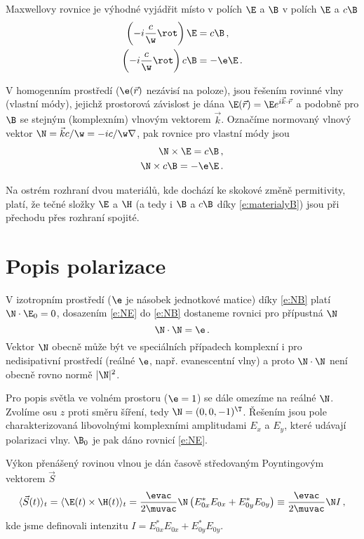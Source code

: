 Maxwellovy rovnice je výhodné vyjádřit místo v polích $\E$ a $\B$ v polích $\E$ a $c\B$
\begin{align}
\left(-i\frac{c}{\w}\rot\right) \E&=c\B \,, \label{e:rotE}\\
\left(-i\frac{c}{\w}\rot\right) c\B&=-\e \E \,. \label{e:rotB}
\end{align}

V homogenním prostředí ($\e(\vec{r})$ nezávisí na poloze), jsou řešením rovinné vlny (vlastní módy), jejichž prostorová závislost je dána $\E(\vec{r})=\E e^{i \vec{k}\cdot\vec{r}}$ a podobně pro $\B$ se stejným (komplexním) vlnovým vektorem $\vec{k}$.
Označíme normovaný vlnový vektor $\N=\vec{k} c/\w=-ic/\w\nabla$, pak rovnice pro vlastní módy jsou
\begin{align}
\N \times \E = c\B \,, \label{e:NE}\\
\N \times c\B = -\e \E \,. \label{e:NB}
\end{align}

Na ostrém rozhraní dvou materiálů, kde dochází ke skokové změně permitivity, platí, že tečné složky $\E$ a $\H$ (a tedy i $\B$ a $c\B$ díky \eqref{e:materialyB}) jsou při přechodu přes rozhraní spojité\cite{Bornwolf}.


\section{Popis polarizace}
V izotropním prostředí ($\e$ je násobek jednotkové matice) díky \eqref{e:NB} platí $\N \cdot \E_0=0$, dosazením \eqref{e:NE} do \eqref{e:NB} dostaneme rovnici pro přípustná $\N$
\begin{equation}
\N \cdot \N =\e \,.
\end{equation}
Vektor $\N$ obecně může být ve speciálních případech komplexní i pro nedisipativní prostředí (reálné $\e$, např. evanescentní vlny) a proto $\N \cdot \N$ není obecně rovno normě $|\N|^2$.

Pro popis světla ve volném prostoru ($\e=1$) se dále omezíme na reálné $\N$.
Zvolíme osu $z$ proti směru šíření, tedy $\N=(0,0,-1)^\T$.
Řešením jsou pole charakterizovaná libovolnými komplexními amplitudami $E_x$ a $E_{y}$, které udávají polarizaci vlny.
$\B_0$ je pak dáno rovnicí \eqref{e:NE}.

Výkon přenášený rovinou vlnou je dán časově středovaným Poyntingovým vektorem $\vec{S}$
\begin{equation} \label{e:intenzita}
\langle \vec{S}(t)\rangle_t=\langle\E(t)\times\H(t)\rangle_t=\frac{\evac}{2\muvac}\N \left( E_{0x}^*E_{0x}+E_{0y}^*E_{0y} \right) \equiv \frac{\evac}{2\muvac}\N I\,,
\end{equation}
kde jsme definovali intenzitu $I=E_{0x}^*E_{0x}+E_{0y}^*E_{0y}$.

